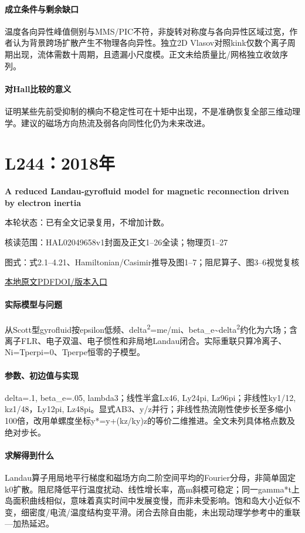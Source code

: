 \paragraph{成立条件与剩余缺口}温度各向异性峰值侧别与MMS/PIC不符，非旋转对称度与各向异性区域过宽，作者认为背景跨场扩散产生不物理各向异性。独立2D Vlasov对照kink仅数个离子周期出现，流体需数十周期，且遗漏小尺度模。正文未给质量比/网格独立收敛序列。

\paragraph{对Hall比较的意义}证明某些先前受抑制的横向不稳定性可在十矩中出现，不是准确恢复全部三维动理学。建议的磁场方向热流及弱各向同性化仍为未来改进。

\section{L244：2018年}\label{paper:L244}

\textbf{A reduced Landau-gyrofluid model for magnetic reconnection driven by electron inertia}\citep{L244}

\textsf{本轮状态：}已有全文记录复用，不增加计数。

\textsf{核读范围：}HAL02049658v1封面及正文1–26全读；物理页1–27\par\textsf{图式：}式2.1–4.21、Hamiltonian/Casimir推导及图1–7；阻尼算子、图3–6视觉复核

\href{run:../../papers/L244.pdf}{本地原文PDF}\quad\href{https://doi.org/10.1017/S002237781800051X}{DOI/版本入口}

\paragraph{实际模型与问题}从Scott型gyrofluid按epsilon低频、delta\textsuperscript{2}=me/mi、beta\_e\textasciitilde{}delta\textsuperscript{2}约化为六场；含离子FLR、电子双温、电子惯性和非局地Landau闭合。实际重联只算冷离子、Ni=Tperpi=0、Tperpe恒零的子模型。

\paragraph{参数、初边值与实现}delta=.1, beta\_e=.05, lambda3；线性半盒Lx46, Ly24pi, Lz96pi；非线性ky1/12, kz1/48，Ly12pi, Lz48pi。显式AB3、y/z并行；非线性热流刚性使步长至多缩小100倍，改用单螺度坐标y*=y+(kz/ky)z的等价二维推进。全文未列具体格点数及绝对步长。

\paragraph{求解得到什么}Landau算子用局地平行梯度和磁场方向二阶空间平均的Fourier分母，非简单固定k0扩散。阻尼降低平行温度扰动、线性增长率，高m斜模可稳定；同一gamma*t上岛面积曲线相似，意味着真实时间中发展变慢，而非未受影响。饱和岛大小近似不变，细密度/电流/温度结构变平滑。闭合去除自由能，未出现动理学参考中的重联—加热延迟。

